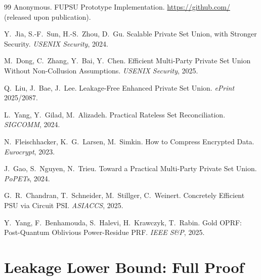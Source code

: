 \begin{thebibliography}{99}
 Anonymous.
\newblock FUPSU Prototype Implementation. \url{https://github.com/} (released upon publication).

 Y.~Jia, S.-F.~Sun, H.-S.~Zhou, D.~Gu.
\newblock Scalable Private Set Union, with Stronger Security. \emph{USENIX Security}, 2024.

 M.~Dong, C.~Zhang, Y.~Bai, Y.~Chen.
\newblock Efficient Multi-Party Private Set Union Without Non-Collusion Assumptions.
\emph{USENIX Security}, 2025.

 Q.~Liu, J.~Bae, J.~Lee.
\newblock Leakage-Free Enhanced Private Set Union. \emph{ePrint} 2025/2087.

 L.~Yang, Y.~Gilad, M.~Alizadeh.
\newblock Practical Rateless Set Reconciliation. \emph{SIGCOMM}, 2024.

 N.~Fleischhacker, K.~G.~Larsen, M.~Simkin.
\newblock How to Compress Encrypted Data. \emph{Eurocrypt}, 2023.

 J.~Gao, S.~Nguyen, N.~Trieu.
\newblock Toward a Practical Multi-Party Private Set Union. \emph{PoPETs}, 2024.

 G.~R.~Chandran, T.~Schneider, M.~Stillger, C.~Weinert.
\newblock Concretely Efficient PSU via Circuit PSI. \emph{ASIACCS}, 2025.

 Y.~Yang, F.~Benhamouda, S.~Halevi, H.~Krawczyk, T.~Rabin.
\newblock Gold OPRF: Post-Quantum Oblivious Power-Residue PRF. \emph{IEEE S\&P}, 2025.

\end{thebibliography}

\newpage
\appendix

\section{Leakage Lower Bound: Full Proof}
\label{sec:lower-proof}

